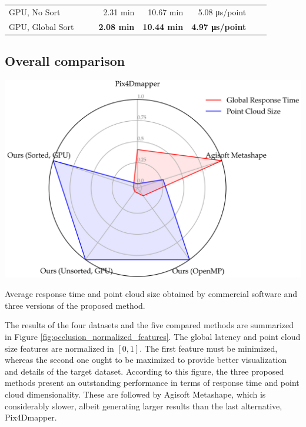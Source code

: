 \begin{table}
\begin{tabular}{l@{\hskip 0.25in}|rrr|r|r|r|r}
    GPU, No Sort & & & 2.31 \si{\minute} & 10.67 \si{\minute} & 5.08 \si{\micro\second}/point & &\\
    GPU, Global Sort & & & \textbf{2.08 \si{\minute}} & \textbf{10.44 \si{\minute}} & \textbf{4.97 \si{\micro\second}/point} & &\\
    \bottomrule
    \end{tabular}
\end{table}
\renewcommand{\arraystretch}{1}

\newpage
\subsection{Overall comparison}

\begin{marginfigure}[.1cm]
    \includegraphics[width=\linewidth]{figs/multi_thermal_projection/results/normalized_features.png}
    \caption{Average response time and point cloud size obtained by commercial software and three versions of the proposed method.}
    \label{fig:occlusion_normalized_features}
\end{marginfigure}
The results of the four datasets and the five compared methods are summarized in Figure \ref{fig:occlusion_normalized_features}. The global latency and point cloud size features are normalized in $[0, 1]$. The first feature must be minimized, whereas the second one ought to be maximized to provide better visualization and details of the target dataset. According to this figure, the three proposed methods present an outstanding performance in terms of response time and point cloud dimensionality. These are followed by Agisoft Metashape, which is considerably slower, albeit generating larger results than the last alternative, Pix4Dmapper.

